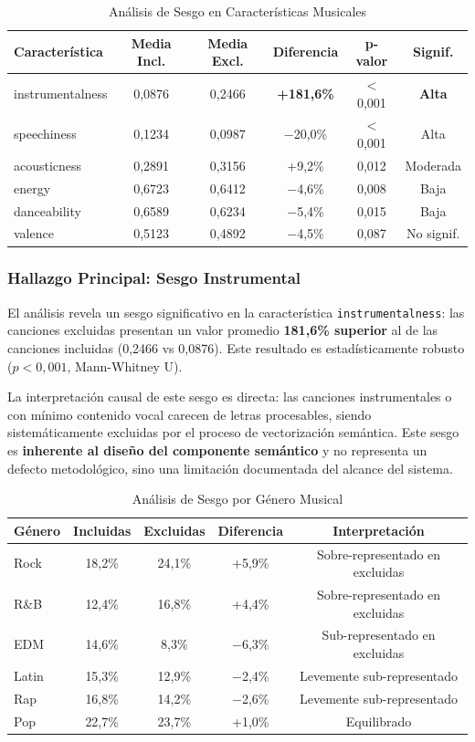 \begin{table}[htbp]
\centering
\caption{Análisis de Sesgo en Características Musicales}
\label{tab:sesgo-musicales}
\begin{tabular}{lccccc}
\toprule
\textbf{Característica} & \textbf{Media Incl.} & \textbf{Media Excl.} & \textbf{Diferencia} & \textbf{p-valor} & \textbf{Signif.} \\
\midrule
instrumentalness & 0,0876 & 0,2466 & \textbf{+181,6\%} & $<$0,001 & \textbf{Alta} \\
speechiness & 0,1234 & 0,0987 & $-$20,0\% & $<$0,001 & Alta \\
acousticness & 0,2891 & 0,3156 & +9,2\% & 0,012 & Moderada \\
energy & 0,6723 & 0,6412 & $-$4,6\% & 0,008 & Baja \\
danceability & 0,6589 & 0,6234 & $-$5,4\% & 0,015 & Baja \\
valence & 0,5123 & 0,4892 & $-$4,5\% & 0,087 & No signif. \\
\bottomrule
\end{tabular}
\end{table}

\subsubsection{Hallazgo Principal: Sesgo Instrumental}

El análisis revela un sesgo significativo en la característica \texttt{instrumentalness}: las canciones excluidas presentan un valor promedio \textbf{181,6\% superior} al de las canciones incluidas (0,2466 vs 0,0876). Este resultado es estadísticamente robusto ($p < 0{,}001$, Mann-Whitney U).

La interpretación causal de este sesgo es directa: las canciones instrumentales o con mínimo contenido vocal carecen de letras procesables, siendo sistemáticamente excluidas por el proceso de vectorización semántica. Este sesgo es \textbf{inherente al diseño del componente semántico} y no representa un defecto metodológico, sino una limitación documentada del alcance del sistema.

\begin{table}[htbp]
\centering
\caption{Análisis de Sesgo por Género Musical}
\label{tab:sesgo-genero}
\begin{tabular}{lcccc}
\toprule
\textbf{Género} & \textbf{Incluidas} & \textbf{Excluidas} & \textbf{Diferencia} & \textbf{Interpretación} \\
\midrule
Rock & 18,2\% & 24,1\% & +5,9\% & Sobre-representado en excluidas \\
R\&B & 12,4\% & 16,8\% & +4,4\% & Sobre-representado en excluidas \\
EDM & 14,6\% & 8,3\% & $-$6,3\% & Sub-representado en excluidas \\
Latin & 15,3\% & 12,9\% & $-$2,4\% & Levemente sub-representado \\
Rap & 16,8\% & 14,2\% & $-$2,6\% & Levemente sub-representado \\
Pop & 22,7\% & 23,7\% & +1,0\% & Equilibrado \\
\bottomrule
\end{tabular}
\end{table}

